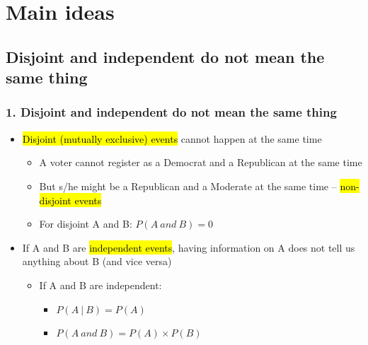 \documentclass[slidestop,compress,mathserif,12pt,t,professionalfonts,xcolor=table]{beamer}
\begin{document}

\section{Main ideas}


\subsection{Disjoint and independent do not mean the same thing}
\label{mi1}


\begin{frame}
\frametitle{1. Disjoint and independent do not mean the same thing}

\begin{itemize}

\item \hl{Disjoint (mutually exclusive) events} cannot happen at the same time
\begin{itemize}
\item A voter cannot register as a Democrat and a Republican at the same time
\item But s/he might be a Republican and a Moderate at the same time -- \hl{non-disjoint events}
\item For disjoint A and B: $P(A~and~B) = 0$
\end{itemize}

\pause

\item If A and B are \hl{independent events}, having information on A does not tell us anything about B (and vice versa)
\begin{itemize}
\item If A and B are independent: 
\begin{itemize}
\item $P(A~|~B) = P(A)$
\item $P(A~and~B) = P(A) \times P(B)$
\end{itemize}
\end{itemize}

\end{itemize}

\end{frame}
\end{document}
